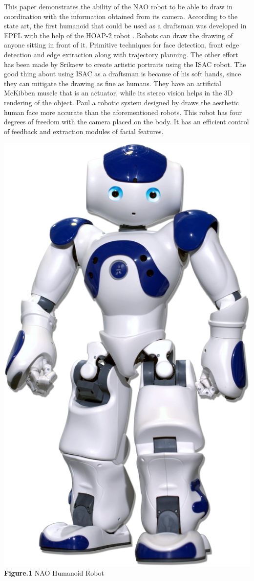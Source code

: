 \documentclass[conference]{IEEEtran}
\begin{document}
This paper demonstrates the ability of the NAO robot to be able to draw in coordination with the information obtained from its camera. According to the state art, the first humanoid that could be used as a draftsman was developed in EPFL with the help of the HOAP-2 robot \cite{ref3}. Robots can draw the drawing of anyone sitting in front of it. Primitive techniques for face detection, front edge detection and edge extraction along with trajectory planning. The other effort has been made by Srikaew \cite{ref4} to create artistic portraits using the ISAC robot. The good thing about using ISAC as a draftsman is because of his soft hands, since they can mitigate the drawing as fine as humans. They have an artificial McKibben muscle that is an actuator, while its stereo vision helps in the 3D rendering of the object. Paul a robotic system designed by \cite{ref5} draws the aesthetic human face more accurate than the aforementioned robots. This robot has four degrees of freedom with the camera placed on the body. It has an efficient control of feedback and extraction modules
of facial features.
\begin{center}	 
\includegraphics[scale=0.2]{nao.jpg}\\ 
\textbf{Figure.1} NAO Humanoid Robot
\end{center}
\end{document}
